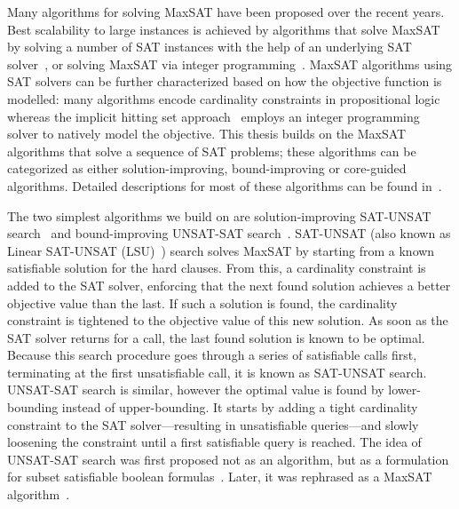 Many algorithms for solving MaxSAT have been proposed over the recent years.
Best scalability to large instances is achieved by algorithms that solve MaxSAT by solving a number of SAT instances with the help of an underlying SAT solver~\autocite{handbook2-cdcl}, or solving MaxSAT via integer programming~\autocite{handbook2-maxsat}.
MaxSAT algorithms using SAT solvers can be further characterized based on how the objective function is modelled:
many algorithms encode cardinality constraints in propositional logic whereas the implicit hitting set approach~\autocite{DBLP:conf/cp/DaviesB13,DBLP:conf/sat/DaviesB13,DBLP:conf/cp/DaviesB11,DBLP:conf/sat/BergBP20} employs an integer programming solver to natively model the objective.
This thesis builds on the MaxSAT algorithms that solve a sequence of SAT problems;
these algorithms can be categorized as either solution-improving, bound-improving or core-guided algorithms.
Detailed descriptions for most of these algorithms can be found in~\autocite{handbook2-maxsat}.

The two simplest algorithms we build on are solution-improving SAT-UNSAT search~\autocite{DBLP:journals/jsat/BerreP10} and bound-improving UNSAT-SAT search~\autocite{DBLP:conf/sat/FuM06}.
SAT-UNSAT (also known as Linear SAT-UNSAT (LSU)~\autocite{handbook2-maxsat}) search solves MaxSAT by starting from a known satisfiable solution for the hard clauses.
From this, a cardinality constraint is added to the SAT solver, enforcing that the next found solution achieves a better objective value than the last.
If such a solution is found, the cardinality constraint is tightened to the objective value of this new solution.
As soon as the SAT solver returns \unsat{} for a call, the last found solution is known to be optimal.
Because this search procedure goes through a series of satisfiable calls first, terminating at the first unsatisfiable call, it is known as SAT-UNSAT search.
UNSAT-SAT search is similar, however the optimal value is found by lower-bounding instead of upper-bounding.
It starts by adding a tight cardinality constraint to the SAT solver---resulting in unsatisfiable queries---and slowly loosening the constraint until a first satisfiable query is reached.
The idea of UNSAT-SAT search was first proposed not as an algorithm, but as a formulation for subset satisfiable boolean formulas~\autocite{DBLP:journals/tcad/XuRS03}.
Later, it was rephrased as a MaxSAT algorithm~\autocite{DBLP:conf/sat/FuM06}.

